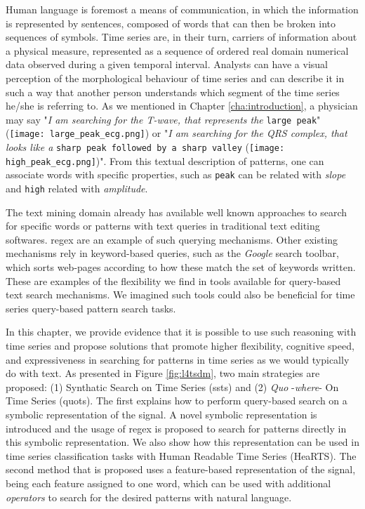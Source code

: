 Human language is foremost a means of communication, in which the information is represented by sentences, composed of words that can then be broken into sequences of symbols. Time series are, in their turn, carriers of information about a physical measure, represented as a sequence of ordered real domain numerical data observed during a given temporal interval. Analysts can have a visual perception of the morphological behaviour of time series and can describe it in such a way that another person understands which segment of the time series he/she is referring to. As we mentioned in Chapter \ref{cha:introduction}, a physician may say "\textit{I am searching for the T-wave, that represents the} \texttt{large peak}" (\texttt{[image: large\_peak\_ecg.png]}) or "\textit{I am searching for the QRS complex, that looks like a} \texttt{sharp peak followed by a sharp valley} (\texttt{[image: high\_peak\_ecg.png]})". From this textual description of patterns, one can associate words with specific properties, such as \texttt{peak} can be related with \textit{slope} and \texttt{high} related with \textit{amplitude}.
\par
The text mining domain already has available well known approaches to search for specific words or patterns with text queries in traditional text editing softwares. \gls{regex} are an example of such querying mechanisms. Other existing mechanisms rely in keyword-based queries, such as the \textit{Google} search toolbar, which sorts web-pages according to how these match the set of keywords written. These are examples of the flexibility we find in tools available for query-based text search mechanisms. We imagined such tools could also be beneficial for time series query-based pattern search tasks.
\par
In this chapter, we provide evidence that it is possible to use such reasoning with time series and propose solutions that promote higher flexibility, cognitive speed, and expressiveness in searching for patterns in time series as we would typically do with text. As presented in Figure \ref{fig:l4tsdm}, two main strategies are proposed: (1) Synthatic Search on Time Series (\gls{ssts}) and (2) \textit{Quo} -\textit{where}- On Time Series (\gls{quots}). The first explains how to perform query-based search on a symbolic representation of the signal. A novel symbolic representation is introduced and the usage of \gls{regex} is proposed to search for patterns directly in this symbolic representation. We also show how this representation can be used in time series classification tasks with Human Readable Time Series (HeaRTS). The second method that is proposed uses a feature-based representation of the signal, being each feature assigned to one word, which can be used with additional \textit{operators} to search for the desired patterns with natural language.
